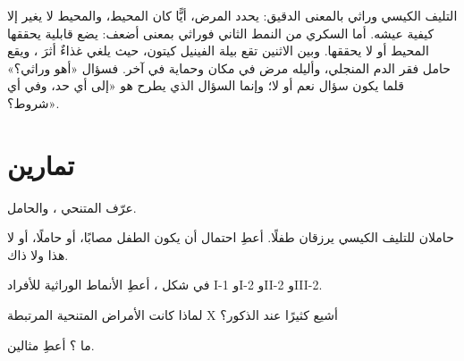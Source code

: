 \begin{remark}\label{rem:g11:genes-and-disease:meaning}
التليف الكيسي وراثي بالمعنى الدقيق:  يحدد المرض، أيًّا
كان المحيط، والمحيط لا يغير إلا كيفية عيشه. أما السكري من النمط الثاني
فوراثي بمعنى أضعف:  يضع قابلية يحققها المحيط أو لا
يحققها. وبين الاثنين تقع بيلة الفينيل كيتون، حيث يلغي غذاءٌ أثرَ ، ويقع حامل فقر الدم المنجلي، وأليله مرض في مكان وحماية في
آخر. فسؤال «أهو وراثي؟» قلما يكون سؤال نعم أو لا؛ وإنما السؤال الذي
يطرح هو «إلى أي حد، وفي أي شروط؟».
\end{remark}

\section{تمارين}

\begin{exercise}[$\star$]\label{exo:g11:genes-and-disease:1}
عرّف  المتنحي  ، والحامل.
\end{exercise}

\begin{exercise}[$\star$]\label{exo:g11:genes-and-disease:2}
حاملان للتليف الكيسي يرزقان طفلًا. أعطِ احتمال أن يكون الطفل مصابًا،
أو حاملًا، أو لا هذا ولا ذاك.
\end{exercise}

\begin{exercise}[$\star$]\label{exo:g11:genes-and-disease:3}
في شكل ، أعطِ الأنماط الوراثية للأفراد I-1 وI-2 وII-2
وIII-2.
\end{exercise}

\begin{exercise}[$\star$]\label{exo:g11:genes-and-disease:4}
لماذا كانت الأمراض المتنحية المرتبطة  X أشيع كثيرًا عند الذكور؟
\end{exercise}

\begin{exercise}[$\star$]\label{exo:g11:genes-and-disease:5}
ما ؟ أعطِ مثالين.
\end{exercise}

